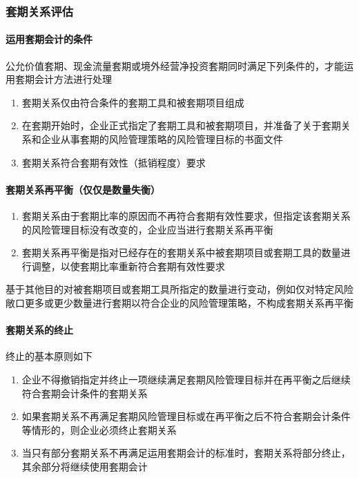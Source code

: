 \documentclass[UTF8,12pt]{ctexart}
\numberwithin{equation}{section} %
\numberwithin{figure}{section}
\numberwithin{table}{section}
\begin{document}
	
	\subsubsection{套期关系评估}
	\paragraph{运用套期会计的条件}
	公允价值套期、现金流量套期或境外经营净投资套期同时满足下列条件的，才能运用套期会计方法进行处理
	\begin{enumerate}
		\item 套期关系仅由符合条件的套期工具和被套期项目组成
		
		\item 在套期开始时，企业正式指定了套期工具和被套期项目，并准备了关于套期关系和企业从事套期的风险管理策略的风险管理目标的书面文件
		
		\item 套期关系符合套期有效性（抵销程度）要求
	\end{enumerate}

	\paragraph{套期关系再平衡（仅仅是数量失衡）}
	\begin{enumerate}
		\item 套期关系由于套期比率的原因而不再符合套期有效性要求，但指定该套期关系的风险管理目标没有改变的，企业应当进行套期关系再平衡
		
		\item 套期关系再平衡是指对已经存在的套期关系中被套期项目或套期工具的数量进行调整，以使套期比率重新符合套期有效性要求
	\end{enumerate}
	基于其他目的对被套期项目或套期工具所指定的数量进行变动，例如仅对特定风险敞口更多或更少数量进行套期以符合企业的风险管理策略，不构成套期关系再平衡
	
	\paragraph{套期关系的终止}
	终止的基本原则如下
	\begin{enumerate}
		\item 企业不得撤销指定并终止一项继续满足套期风险管理目标并在再平衡之后继续符合套期会计条件的套期关系
		
		\item 如果套期关系不再满足套期风险管理目标或在再平衡之后不符合套期会计条件等情形的，则企业必须终止套期关系
		
		\item 当只有部分套期关系不再满足运用套期会计的标准时，套期关系将部分终止，其余部分将继续使用套期会计
	\end{enumerate}
\end{document}
